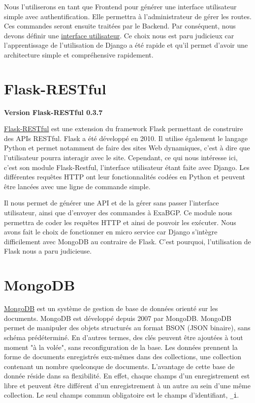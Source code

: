 Nous l'utiliserons en tant que Frontend pour générer une interface utilisateur simple avec authentification. Elle permettra à l'administrateur de gérer les routes. Ces commandes seront ensuite traitées par le Backend. Par conséquent, nous devons définir une \hyperref[sssec:ui]{interface utilisateur}. Ce choix nous est paru judicieux car l'apprentissage de l'utilisation de Django a été rapide et qu'il permet d'avoir une architecture simple et compréhensive rapidement.

\section{Flask-RESTful}
\textbf{Version Flask-RESTful 0.3.7}

\href{https://flask-restful.readthedocs.io/en/latest/}{Flask-RESTful} est une extension du framework Flask permettant de construire des APIs RESTful. Flask a été développé en 2010. Il utilise également le langage Python et permet notamment de faire des sites Web dynamiques, c'est à dire que l'utilisateur pourra interagir avec le site. Cependant, ce qui nous intéresse ici, c'est son module Flask-Restful, l'interface utilisateur étant faite avec Django. Les différentes requêtes HTTP ont leur fonctionnalités codées en Python et peuvent être lancées avec une ligne de commande simple.

Il nous permet de générer une API et de la gérer sans passer l'interface utilisateur, ainsi que d'envoyer des commandes à ExaBGP. Ce module nous permettra de coder les requêtes HTTP et ainsi de pouvoir les exécuter. Nous avons fait le choix de fonctionner en micro service car Django s'intègre difficilement avec MongoDB au contraire de Flask. C'est pourquoi, l'utilisation de Flask nous a paru judicieuse.

\section{MongoDB}
\href{https://www.mongodb.com/fr}{MongoDB} est un système de gestion de base de données orienté sur les documents. MongoDB est développé depuis 2007 par MongoDB. MongoDB permet de manipuler des objets structurés au format BSON (JSON binaire), sans schéma prédéterminé. En d'autres termes, des clés peuvent être ajoutées à tout moment "à la volée", sans reconfiguration de la base. Les données prennent la forme de documents enregistrés eux-mêmes dans des collections, une collection contenant un nombre quelconque de documents. L'avantage de cette base de donnée réside dans sa flexibilité. En effet, chaque champs d'un enregistrement est libre et peuvent être différent d'un enregistrement à un autre au sein d'une même collection. Le seul champs commun obligatoire est le champs d'identifiant, \verb+_i+.

